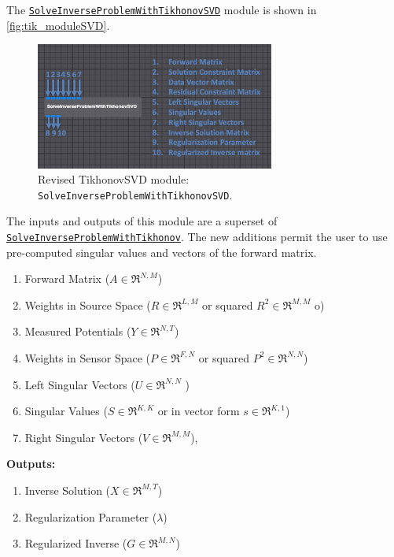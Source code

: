     The \href{http://scirundocwiki.sci.utah.edu/SCIRunDocs/index.php5/CIBC:Documentation:SCIRun:Reference:BioPSE:SolveInverseProblemWithTikhonovSVD}{{\tt SolveInverseProblemWithTikhonovSVD}} module is shown in \autoref{fig:tik_moduleSVD}.
    \begin{figure}
        \begin{center}
        \includegraphics[width=0.7\textwidth]{ECGToolkitGuide_figures/TikhonovSVD_module.png}
        \caption{Revised TikhonovSVD module: {\tt SolveInverseProblemWithTikhonovSVD}.  }
        \label{fig:tik_moduleSVD}
        \end{center}
    \end{figure}
    The inputs and outputs of this module are a superset of \href{http://scirundocwiki.sci.utah.edu/SCIRunDocs/index.php/CIBC:Documentation:SCIRun:Reference:BioPSE:SolveInverseProblemWithTikhonov}{{\tt SolveInverseProblemWithTikhonov}}.
    The new additions permit the user to use pre-computed singular values and vectors of the forward matrix.
    \begin{enumerate}
        \item Forward Matrix ($A\in\Re^{N,M}$)
        \item Weights in Source Space ($R\in\Re^{L,M}$ or squared $R^2\in\Re^{M,M}$ o)
        \item Measured Potentials ($Y\in\Re^{N,T}$)
        \item Weights in Sensor Space ($P\in\Re^{F,N}$ or squared $P^2\in\Re^{N,N}$)
        \item Left Singular Vectors ($U\in\Re^{N,N}$ )
        \item Singular Values ($S\in\Re^{K,K}$ or in vector form $s\in\Re^{K,1}$)
        \item Right Singular Vectors ($V\in\Re^{M,M}$),
    \end{enumerate}
    {\bf Outputs:}
     \begin{enumerate}
        \item Inverse Solution ($X\in\Re^{M,T}$)
        \item Regularization Parameter ($\lambda$)
        \item Regularized Inverse ($G\in\Re^{M,N}$)
    \end{enumerate}

